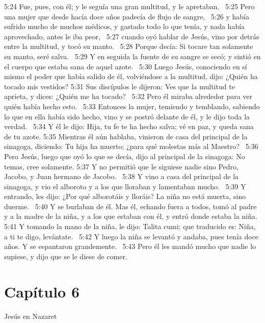 5:24 Fue, pues, con él; y le seguía una gran multitud, y le apretaban.  
5:25 Pero una mujer que desde hacía doce años padecía de flujo de sangre,  
5:26 y había sufrido mucho de muchos médicos, y gastado todo lo que tenía, y nada había aprovechado, antes le iba peor,  
5:27 cuando oyó hablar de Jesús, vino por detrás entre la multitud, y tocó su manto.  
5:28 Porque decía: Si tocare tan solamente su manto, seré salva.  
5:29 Y en seguida la fuente de su sangre se secó; y sintió en el cuerpo que estaba sana de aquel azote.  
5:30 Luego Jesús, conociendo en sí mismo el poder que había salido de él, volviéndose a la multitud, dijo: ¿Quién ha tocado mis vestidos? 
5:31 Sus discípulos le dijeron: Ves que la multitud te aprieta, y dices: ¿Quién me ha tocado?  
5:32 Pero él miraba alrededor para ver quién había hecho esto.  
5:33 Entonces la mujer, temiendo y temblando, sabiendo lo que en ella había sido hecho, vino y se postró delante de él, y le dijo toda la verdad.  
5:34 Y él le dijo: Hija, tu fe te ha hecho salva; vé en paz, y queda sana de tu azote. 
5:35 Mientras él aún hablaba, vinieron de casa del principal de la sinagoga, diciendo: Tu hija ha muerto; ¿para qué molestas más al Maestro?  
5:36 Pero Jesús, luego que oyó lo que se decía, dijo al principal de la sinagoga: No temas, cree solamente. 
5:37 Y no permitió que le siguiese nadie sino Pedro, Jacobo, y Juan hermano de Jacobo.  
5:38 Y vino a casa del principal de la sinagoga, y vio el alboroto y a los que lloraban y lamentaban mucho.  
5:39 Y entrando, les dijo: ¿Por qué alborotáis y lloráis? La niña no está muerta, sino duerme.  
5:40 Y se burlaban de él. Mas él, echando fuera a todos, tomó al padre y a la madre de la niña, y a los que estaban con él, y entró donde estaba la niña.  
5:41 Y tomando la mano de la niña, le dijo: Talita cumi; que traducido es: Niña, a ti te digo, levántate.  
5:42 Y luego la niña se levantó y andaba, pues tenía doce años. Y se espantaron grandemente.  
5:43 Pero él les mandó mucho que nadie lo supiese, y dijo que se le diese de comer.  
\section*{Capítulo 6}
Jesús en Nazaret   

